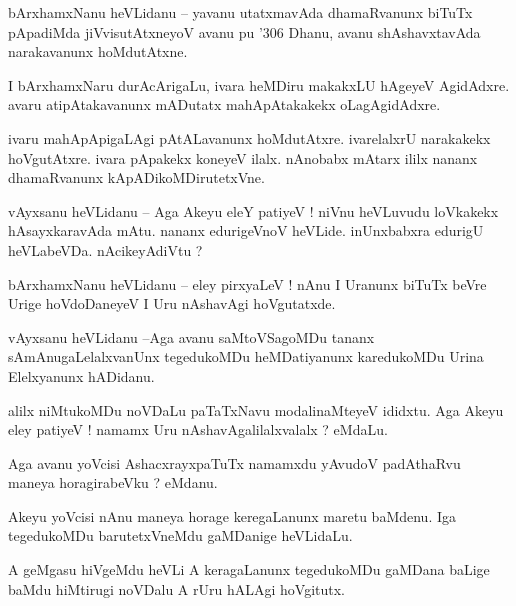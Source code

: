 \documentclass{article}
\begin{document}
\begin{mng}%
bArxhamxNanu heVLidanu -- yavanu utatxmavAda dhamaRvanunx biTuTx pApadiMda jiVvisutAtxneyoV avanu pu
\char'306 Dhanu, avanu shAshavxtavAda narakavanunx hoMdutAtxne.
\end{mng}

\begin{mng}%
I bArxhamxNaru durAcArigaLu, ivara heMDiru makakxLU hAgeyeV AgidAdxre. avaru atipAtakavanunx 
mADutatx mahApAtakakekx oLagAgidAdxre.
\end{mng}

\begin{mng}%
ivaru mahApApigaLAgi pAtALavanunx hoMdutAtxre. ivarelalxrU narakakekx hoVgutAtxre. ivara pApakekx 
koneyeV ilalx. nAnobabx mAtarx ililx nananx dhamaRvanunx kApADikoMDirutetxVne.
\end{mng}

\begin{mng}%
vAyxsanu heVLidanu -- Aga Akeyu eleY patiyeV ! niVnu heVLuvudu loVkakekx hAsayxkaravAda mAtu. 
nananx edurigeVnoV heVLide. inUnxbabxra edurigU heVLabeVDa. nAcikeyAdiVtu ?
\end{mng}

\begin{mng}%
bArxhamxNanu heVLidanu -- eley pirxyaLeV ! nAnu I Uranunx biTuTx beVre Urige hoVdoDaneyeV I Uru 
nAshavAgi hoVgutatxde.
\end{mng}

\begin{mng}%
vAyxsanu heVLidanu --Aga avanu saMtoVSagoMDu tananx sAmAnugaLelalxvanUnx tegedukoMDu heMDatiyanunx 
karedukoMDu Urina Elelxyanunx hADidanu.
\end{mng}

\begin{mng}%
alilx niMtukoMDu noVDaLu paTaTxNavu modalinaMteyeV ididxtu. Aga Akeyu eley patiyeV ! namamx Uru 
nAshavAgalilalxvalalx ? eMdaLu.
\end{mng}

\begin{mng}%
Aga avanu yoVcisi AshacxrayxpaTuTx namamxdu yAvudoV padAthaRvu maneya horagirabeVku ? eMdanu.
\end{mng}

\begin{mng}%
Akeyu yoVcisi nAnu maneya horage keregaLanunx maretu baMdenu. Iga tegedukoMDu barutetxVneMdu 
gaMDanige heVLidaLu.
\end{mng}

\begin{mng}%
A geMgasu hiVgeMdu heVLi A keragaLanunx tegedukoMDu gaMDana baLige baMdu hiMtirugi noVDalu A rUru 
hALAgi hoVgitutx.
\end{mng}
\end{document}
